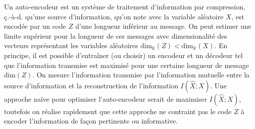 Un auto-encodeur est un système de traitement d'information par compression, ç.-à-d. qu'une source d'information, qu'on note avec la 
variable aléatoire $X$, est encodée par un code $Z$ d'une longueur inférieur au message. On peut estimer une 
limite supérieur pour la longueur de ces messages avec dimensionalité des vecteurs représentant les variables aléatoires $\mathrm{dim}_{\mathbb{R}}(Z) < \mathrm{dim}_{\mathbb{R}}(X)$. 
En principe, il est possible d'entraîner (ou choisir) un encodeur et un décodeur tel que l'information transmise est 
maximisé pour une certaine longueur de message $\mathrm{dim}(Z)$. On mesure l'information transmise par l'information 
mutuelle entre la source d'information et la reconstruction de l'information $I(\hat{X};X)$. 
Une approche naïve pour optimiser l'auto-encodeur serait de maximiser $I(\hat{X} ; X)$, toutefois on 
réalise rapidement que cette approche ne contraint pas le code $Z$ à encoder l'information de façon pertinente 
ou informative. 


